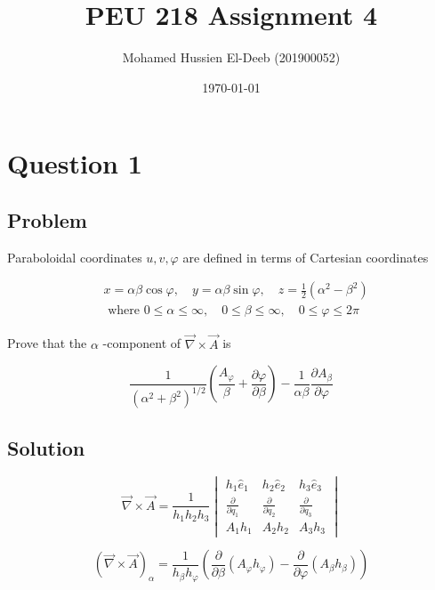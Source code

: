 \documentclass[12pt]{article}
\title{PEU 218 Assignment 4}
\author{Mohamed Hussien El-Deeb (201900052)}
\date{\today}
\begin{document}
\maketitle
\tableofcontents
\hypersetup{linkcolor=RoyalBlue4}

\newpage
\section{Question 1}

\subsection{Problem}

Paraboloidal coordinates \(u, v, \varphi \) are defined in terms of Cartesian coordinates

\[
    \begin{aligned}
         & x=\alpha \beta \cos \varphi, \quad y=\alpha \beta \sin \varphi, \quad z=\frac{1}{2}\left(\alpha^2-\beta^2\right) \\
         & \text { where } 0 \leq \alpha \leq \infty, \quad 0 \leq \beta \leq \infty, \quad 0 \leq \varphi \leq 2 \pi
    \end{aligned}
\]

Prove that the \(\alpha \) -component of \(\vec{\nabla} \times \vec{A}\) is

\[
    \frac{1}{{\left(\alpha^2+\beta^2\right)}^{1 / 2}}\left(\frac{A_{\varphi}}{\beta}+\frac{\partial \varphi}{\partial \beta}\right)-\frac{1}{\alpha \beta} \frac{\partial A_\beta}{\partial \varphi}
\]

\subsection{Solution}

\[
    \vec{\nabla} \times \vec{A} = \frac{1}{h_1 h_2 h_3}\begin{vmatrix}
        h_1 \hat{e}_1                 & h_2 \hat{e}_2                 & h_3 \hat{e}_3                 \\
        \frac{\partial}{\partial q_1} & \frac{\partial}{\partial q_2} & \frac{\partial}{\partial q_3} \\
        A_1 h_1                       & A_2 h_2                       & A_3 h_3
    \end{vmatrix}
\]

\[
    {(\vec{\nabla} \times \vec{A})}_\alpha =
    \frac{1}{h_\beta h_\varphi}\left(\frac{\partial}{\partial \beta}\left(A_\varphi h_\varphi\right) - \frac{\partial}{\partial \varphi}\left(A_\beta h_\beta\right)\right)
\]
\end{document}
